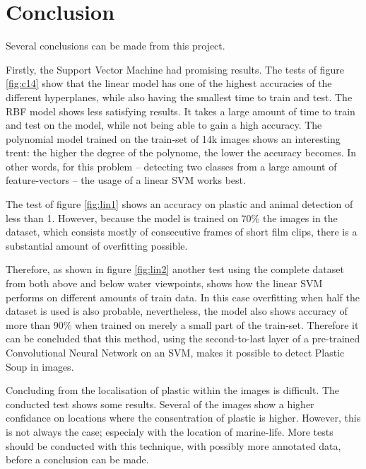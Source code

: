 \section{Conclusion}
\label{sec:Conclusion}
Several conclusions can be made from this project.

Firstly, the Support Vector Machine had promising results.
The tests of figure \ref{fig:c14} show that the linear model has one of the highest accuracies of the different hyperplanes, while also having the smallest time to train and test.
The RBF model shows less satisfying results.
It takes a large amount of time to train and test on the model, while not being able to gain a high accuracy.
The polynomial model trained on the train-set of 14k images shows an interesting trent: the higher the degree of the polynome, the lower the accuracy becomes.
In other words, for this problem -- detecting two classes from a large amount of feature-vectors -- the usage of a linear SVM works best.

The test of figure \ref{fig:lin1} shows an accuracy on plastic and animal detection of less than 1\permil.
However, because the model is trained on 70\% the images in the dataset, which consists mostly of consecutive frames of short film clips, there is a substantial amount of overfitting possible.

Therefore, as shown in figure \ref{fig:lin2} another test using the complete dataset from both above and below water viewpoints, shows how the linear SVM performs on different amounts of train data.
In this case overfitting when half the dataset is used is also probable, nevertheless, the model also shows accuracy of more than 90\% when trained on merely a small part of the train-set.
Therefore it can be concluded that this method, using the second-to-last layer of a pre-trained Convolutional Neural Network on an SVM, makes it possible to detect Plastic Soup in images.

Concluding from the localisation of plastic within the images is difficult.
The conducted test shows some results.
Several of the images show a higher confidance on locations where the consentration of plastic is higher.
However, this is not always the case; especialy with the location of marine-life.
More tests should be conducted with this technique, with possibly more annotated data, before a conclusion can be made.

